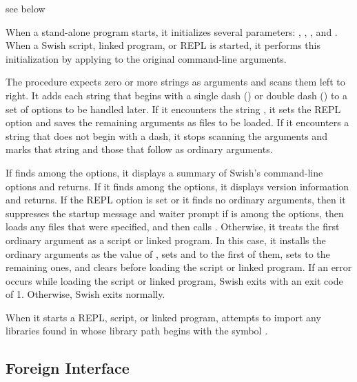 \begin{procedure}
\end{procedure}
\returns{} see below

When a stand-alone program starts, it initializes several parameters:
, , , and
.
When a Swish script, linked program, or REPL is started, it performs this
initialization by applying  to the original command-line
arguments.

The  procedure expects zero or more strings as arguments
and scans them left to right.
It adds each string that begins with a single dash (\sopt{}) or double dash
(\lopt{}) to a set of options to be handled later.
If it encounters the string \str{\lopt{}}, it sets the REPL option and
saves the remaining arguments as files to be loaded.
If it encounters a string that does not begin with a dash, it stops scanning
the arguments and marks that string and those that follow as ordinary
arguments.

If  finds  among the options,
it displays a summary of Swish's command-line options and returns.
If it finds  among the options,
it displays version information and returns.
If the REPL option is set or it finds no ordinary arguments, then it
suppresses the startup message and waiter prompt 
if  is among the options,
then loads any files that were specified,
and then calls . 
Otherwise, it treats the first ordinary argument as a script or linked program.
In this case, it installs the ordinary arguments as
the value of ,
sets  and  to the first of them,
sets  to the remaining ones,
and clears 
before loading the script or linked program.
If an error occurs while loading the script or linked program,
Swish exits with an exit code of 1.
Otherwise, Swish exits normally.

When it starts a REPL, script, or linked program,  attempts
to import any libraries found in  whose library path begins
with the symbol .

\subsection{Foreign Interface}

